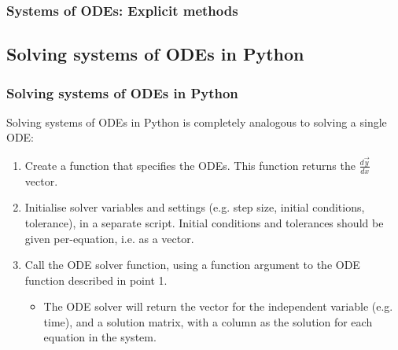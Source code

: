 \begin{frame}
  \frametitle{Systems of ODEs: Explicit methods}
\end{frame}

\subsection{Solving systems of ODEs in Python}
\begin{frame}
  \frametitle{Solving systems of ODEs in Python}
  Solving systems of ODEs in Python is completely analogous to solving a single ODE:
  \vspace*{1em}
  \begin{enumerate}
    \item Create a function that specifies the ODEs. This function returns the $\frac{d\vec{y}}{dx}$ vector.
    \item Initialise solver variables and settings (e.g. step size, initial conditions, tolerance), in a separate script. Initial conditions and tolerances should be given per-equation, i.e. as a vector.
    \item Call the ODE solver function, using a function argument to the ODE function described in point 1.
    \begin{itemize}
      \item The ODE solver will return the vector for the independent variable (e.g. time), and a solution matrix, with a column as the solution for each equation in the system.
    \end{itemize}
  \end{enumerate}
\end{frame}

